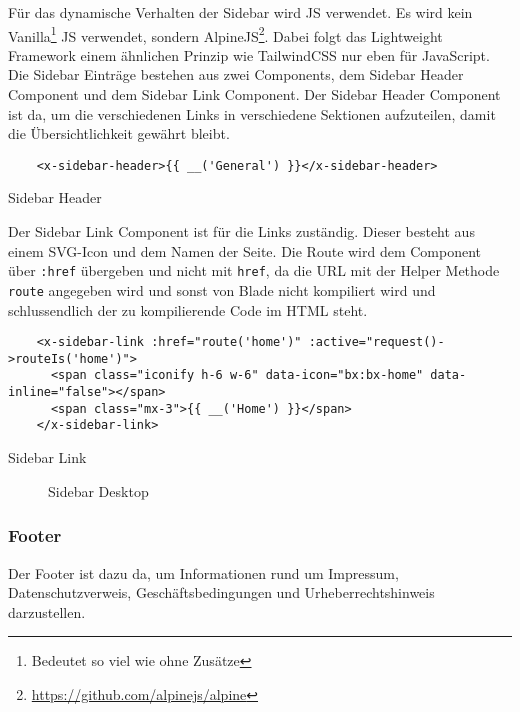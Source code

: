 Für das dynamische Verhalten der Sidebar wird \acl*{JS} verwendet. Es wird kein
Vanilla\footnote{Bedeutet so viel wie ohne Zusätze} \acl*{JS} verwendet, sondern
AlpineJS\footnote{\url{https://github.com/alpinejs/alpine}}. Dabei folgt das
Lightweight Framework einem ähnlichen Prinzip wie TailwindCSS nur eben für
JavaScript.\\

Die Sidebar Einträge bestehen aus zwei Components, dem Sidebar Header Component
und dem Sidebar Link Component. Der Sidebar Header Component ist da, um die verschiedenen Links in verschiedene
Sektionen aufzuteilen, damit die Übersichtlichkeit gewährt bleibt.

\begin{listing}[H]
  \begin{verbatim}
    <x-sidebar-header>{{ __('General') }}</x-sidebar-header>
  \end{verbatim}
  \caption{Sidebar Header}
\end{listing}

Der Sidebar Link Component ist für die Links zuständig. Dieser besteht aus einem
\acs*{SVG}-Icon und dem Namen der Seite. Die Route wird dem Component über
\verb|:href| übergeben und nicht mit \verb|href|, da die URL mit der Helper
Methode \verb|route| angegeben wird und sonst von Blade nicht kompiliert wird
und schlussendlich der zu kompilierende Code im HTML steht.

\begin{listing}[H]
  \begin{verbatim}
    <x-sidebar-link :href="route('home')" :active="request()->routeIs('home')">
      <span class="iconify h-6 w-6" data-icon="bx:bx-home" data-inline="false"></span>
      <span class="mx-3">{{ __('Home') }}</span>
    </x-sidebar-link>
  \end{verbatim}
  \caption{Sidebar Link}
\end{listing}
\begin{figure}[H]
  \centering
  \caption{Sidebar Desktop}
\end{figure}

\subsubsection{Footer}
Der Footer ist dazu da, um Informationen rund um Impressum, Datenschutzverweis,
Geschäftsbedingungen und Urheberrechtshinweis darzustellen.\\

